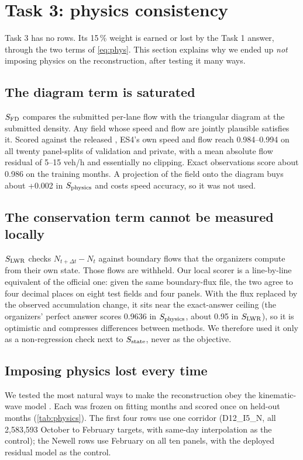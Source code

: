 \section{Task 3: physics consistency}\label{sec:physics}

Task 3 has no rows. Its 15\,\% weight is earned or lost by the Task 1 answer, through the two terms of
\cref{eq:phys}. This section explains why we ended up \emph{not} imposing physics on the reconstruction, after
testing it many ways.

\subsection{The diagram term is saturated}
$S_{\mathrm{FD}}$ compares the submitted per-lane flow with the triangular diagram at the submitted density. Any field whose
speed and flow are jointly plausible satisfies it. Scored against the released , ES4's own
speed and flow reach 0.984--0.994 on all twenty panel-splits of validation and private, with a mean absolute flow
residual of 5--15 veh/h and essentially no clipping. Exact observations score about 0.986 on the training months. A
projection of the field onto the diagram buys about +0.002 in $S_{\mathrm{physics}}$ and costs speed accuracy, so it was not used.

\subsection{The conservation term cannot be measured locally}
$S_{\mathrm{LWR}}$ checks $N_{t+\Delta t}-N_t$ against boundary flows that the organizers compute from their own state. Those flows
are withheld. Our local scorer is a line-by-line equivalent of the official one: given the same boundary-flux file,
the two agree to four decimal places on eight test fields and four panels. With the flux replaced by the observed accumulation
change, it sits near the exact-answer ceiling (the organizers' perfect answer scores 0.9636 in $S_{\mathrm{physics}}$, about 0.95 in
$S_{\mathrm{LWR}}$), so it is optimistic and compresses differences between methods. We therefore used it only as a
non-regression check next to $S_{\mathrm{state}}$, never as the objective.

\subsection{Imposing physics lost every time}
We tested the most natural ways to make the reconstruction obey the kinematic-wave model \cite{lighthill1955,richards1956,treiber2013}.
Each was frozen on fitting months and scored once on held-out months (\cref{tab:physics}). The first four rows use
one corridor (D12\_I5\_N, all 2,583,593 October to February targets, with same-day interpolation as the control); the
Newell rows use February on all ten panels, with the deployed residual model as the control.


